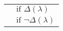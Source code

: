 \begin{tabular}{ m{2cm} m{3cm} }
    \hspace*{-0.14in}
    \centering{}
    &
        $\text{if } \Delta (\lambda)$
    \\
    \hspace*{-0.14in}
    \centering{}
    &
        $\text{if } \lnot \Delta (\lambda)$
    \\
\end{tabular}